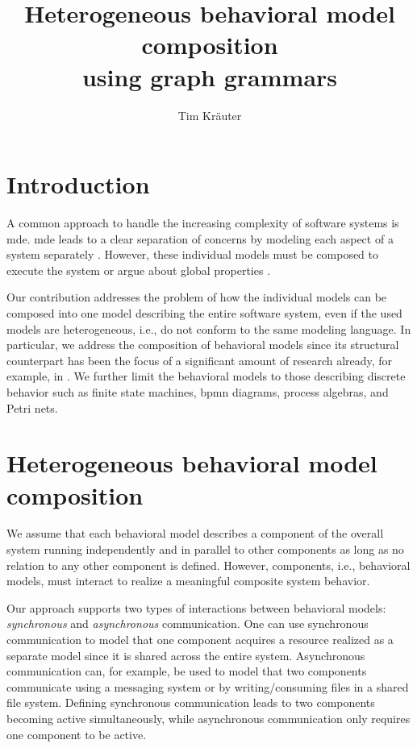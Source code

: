 \documentclass[a4paper]{easychair}
\title{Heterogeneous behavioral model composition \\
        using graph grammars}
\author{
Tim Kräuter
}
\institute{
  Høgskulen på Vestlandet\\
  Bergen, Norway\\
  \email{tkra@hvl.no}
 }
\begin{document}
\maketitle

\section{Introduction}
A common approach to handle the increasing complexity of software systems is \gls*{mde}.
\gls*{mde} leads to a clear separation of concerns by modeling each aspect of a system separately \cite{franceModeldrivenDevelopmentComplex2007}.
However, these individual models must be composed to execute the system or argue about global properties \cite{kienzleUnifyingFrameworkHomogeneous2019}.

Our contribution addresses the problem of how the individual models can be composed into one model describing the entire software system, even if the used models are heterogeneous, i.e., do not conform to the same modeling language.
In particular, we address the composition of behavioral models since its structural counterpart has been the focus of a significant amount of research already, for example, in \cite{kienzleUnifyingFrameworkHomogeneous2019, klareCommonalitiesPreservingConsistency2019, stunkelComprehensiveSystemsFormal2021}.
We further limit the behavioral models to those describing discrete behavior such as finite state machines, \gls*{bpmn} diagrams, process algebras, and Petri nets. %

\section{Heterogeneous behavioral model composition}
We assume that each behavioral model describes a component of the overall system running independently and in parallel to other components as long as no relation to any other component is defined.
However, components, i.e., behavioral models, must interact to realize a meaningful composite system behavior.

Our approach supports two types of interactions between behavioral models: \textit{synchronous} and \textit{asynchronous} communication.
One can use synchronous communication to model that one component acquires a resource realized as a separate model since it is shared across the entire system.
Asynchronous communication can, for example, be used to model that two components communicate using a messaging system or by writing/consuming files in a shared file system.
Defining synchronous communication leads to two components becoming active simultaneously, while asynchronous communication only requires one component to be active. 
\end{document}
